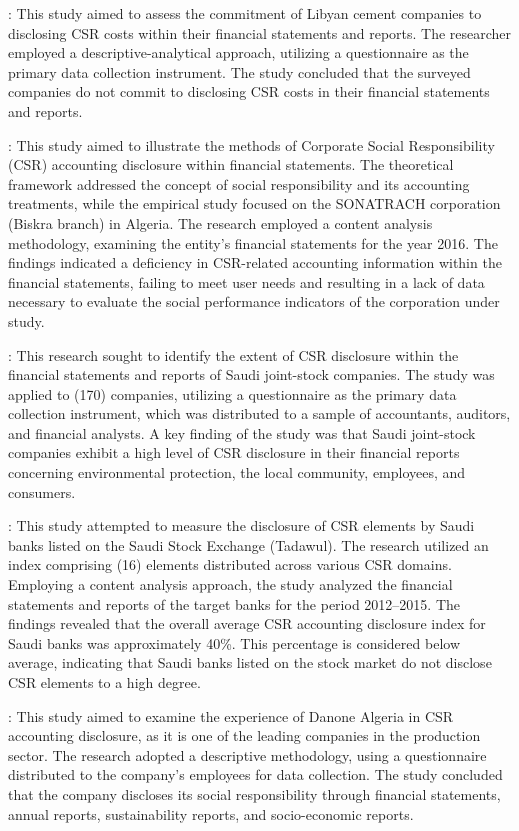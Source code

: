 \documentclass{NSP1}
\begin{document}
\cite{ref23}: This study aimed to assess the commitment of Libyan cement companies to disclosing CSR costs within their financial statements and reports. The researcher employed a descriptive-analytical approach, utilizing a questionnaire as the primary data collection instrument. The study concluded that the surveyed companies do not commit to disclosing CSR costs in their financial statements and reports.

\cite{ref10}: This study aimed to illustrate the methods of Corporate Social Responsibility (CSR) accounting disclosure within financial statements. The theoretical framework addressed the concept of social responsibility and its accounting treatments, while the empirical study focused on the SONATRACH corporation (Biskra branch) in Algeria. The research employed a content analysis methodology, examining the entity's financial statements for the year 2016. The findings indicated a deficiency in CSR-related accounting information within the financial statements, failing to meet user needs and resulting in a lack of data necessary to evaluate the social performance indicators of the corporation under study.

\cite{ref27}: This research sought to identify the extent of CSR disclosure within the financial statements and reports of Saudi joint-stock companies. The study was applied to (170) companies, utilizing a questionnaire as the primary data collection instrument, which was distributed to a sample of accountants, auditors, and financial analysts. A key finding of the study was that Saudi joint-stock companies exhibit a high level of CSR disclosure in their financial reports concerning environmental protection, the local community, employees, and consumers.

\cite{ref5}: This study attempted to measure the disclosure of CSR elements by Saudi banks listed on the Saudi Stock Exchange (Tadawul). The research utilized an index comprising (16) elements distributed across various CSR domains. Employing a content analysis approach, the study analyzed the financial statements and reports of the target banks for the period 2012--2015. The findings revealed that the overall average CSR accounting disclosure index for Saudi banks was approximately 40\%. This percentage is considered below average, indicating that Saudi banks listed on the stock market do not disclose CSR elements to a high degree.

\cite{ref22}: This study aimed to examine the experience of Danone Algeria in CSR accounting disclosure, as it is one of the leading companies in the production sector. The research adopted a descriptive methodology, using a questionnaire distributed to the company's employees for data collection. The study concluded that the company discloses its social responsibility through financial statements, annual reports, sustainability reports, and socio-economic reports.
\end{document}
